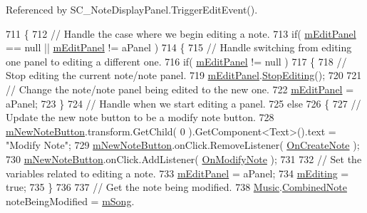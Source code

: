 Referenced by S\+C\+\_\+\+Note\+Display\+Panel.\+Trigger\+Edit\+Event().


\begin{DoxyCode}
711     \{
712         \textcolor{comment}{// Handle the case where we begin editing a note.}
713         \textcolor{keywordflow}{if}( \hyperlink{group___s_c_priv_var_ga0f5cfc2d0492190ded3fbda5b43b45e4}{mEditPanel} == null || \hyperlink{group___s_c_priv_var_ga0f5cfc2d0492190ded3fbda5b43b45e4}{mEditPanel} != aPanel )
714         \{
715             \textcolor{comment}{// Handle switching from editing one panel to editing a different one.}
716             \textcolor{keywordflow}{if}( \hyperlink{group___s_c_priv_var_ga0f5cfc2d0492190ded3fbda5b43b45e4}{mEditPanel} != null )
717             \{
718                 \textcolor{comment}{// Stop editing the current note/note panel.}
719                 \hyperlink{group___s_c_priv_var_ga0f5cfc2d0492190ded3fbda5b43b45e4}{mEditPanel}.\hyperlink{group___s_c___n_d_p_unity_ga92d0f078c4efd6c207173a10e31b5065}{StopEditing}();
720 
721                 \textcolor{comment}{// Change the note/note panel being edited to the new one.}
722                 \hyperlink{group___s_c_priv_var_ga0f5cfc2d0492190ded3fbda5b43b45e4}{mEditPanel} = aPanel;
723             \}
724             \textcolor{comment}{// Handle when we start editing a panel.}
725             \textcolor{keywordflow}{else}
726             \{
727                 \textcolor{comment}{// Update the new note button to be a modify note button.}
728                 \hyperlink{group___s_c_priv_var_ga488ce0727c77abe7c84989241f4e55b4}{mNewNoteButton}.transform.GetChild( 0 ).GetComponent<Text>().text = \textcolor{stringliteral}{"Modify
       Note"};
729                 \hyperlink{group___s_c_priv_var_ga488ce0727c77abe7c84989241f4e55b4}{mNewNoteButton}.onClick.RemoveListener( 
      \hyperlink{group___s_c_handlers_ga70f2fdac755a6b62f48afd96f2446d71}{OnCreateNote} );
730                 \hyperlink{group___s_c_priv_var_ga488ce0727c77abe7c84989241f4e55b4}{mNewNoteButton}.onClick.AddListener( \hyperlink{group___s_c_handlers_gadcf6d627fa8dc06d04c27512ce59dd85}{OnModifyNote} );
731 
732                 \textcolor{comment}{// Set the variables related to editing a note.}
733                 \hyperlink{group___s_c_priv_var_ga0f5cfc2d0492190ded3fbda5b43b45e4}{mEditPanel} = aPanel;
734                 \hyperlink{group___s_c_priv_var_ga5aec1c6ae4159b96ce466ee6b1da3371}{mEditing} = \textcolor{keyword}{true};
735             \}
736 
737             \textcolor{comment}{// Get the note being modified.}
738             \hyperlink{class_music}{Music}.\hyperlink{group___music_structs_struct_music_1_1_combined_note}{CombinedNote} noteBeingModified = \hyperlink{group___s_c_priv_var_ga9554e9b3758d1cc1e841a5f7d8aa9f56}{mSong}.

\end{DoxyCode}
